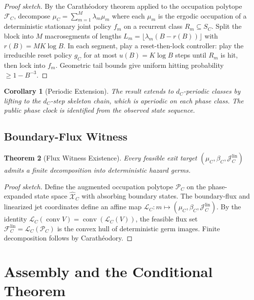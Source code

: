 \documentclass[12pt,a4paper]{article}
\newtheorem{theorem}{Theorem}[section]
\newtheorem{corollary}[theorem]{Corollary}
\theoremstyle{definition}
\newcommand{\cX}{\mathcal{X}}
\newcommand{\cF}{\mathcal{F}}
\newcommand{\cJ}{\mathcal{J}}
\newcommand{\cL}{\mathcal{L}}
\newcommand{\cP}{\mathcal{P}}
\DeclareMathOperator{\conv}{conv}
\begin{document}
\begin{proof}[Proof sketch]
By the Carath\'eodory theorem applied to the occupation polytope $\cF_C$, decompose $\mu_C = \sum_{m=1}^M \lambda_m \mu_m$ where each $\mu_m$ is the ergodic occupation of a deterministic stationary joint policy $f_m$ on a recurrent class $R_m \subseteq S_C$. Split the block into $M$ macrosegments of lengths $L_m = \lfloor \lambda_m(B - r(B)) \rfloor$ with $r(B) = MK \log B$. In each segment, play a reset-then-lock controller: play the irreducible reset policy $g_C$ for at most $u(B) = K \log B$ steps until $R_m$ is hit, then lock into $f_m$. Geometric tail bounds give uniform hitting probability $\geq 1 - B^{-3}$.
\end{proof}

\begin{corollary}[Periodic Extension]
\label{cor:periodic}
The result extends to $d_C$-periodic classes by lifting to the $d_C$-step skeleton chain, which is aperiodic on each phase class. The public phase clock is identified from the observed state sequence.
\end{corollary}

\subsection{Boundary-Flux Witness}
\label{sec:flux-witness}

\begin{theorem}[Flux Witness Existence]
\label{thm:flux-witness}
Every feasible exit target $(\mu_C, \beta_C, \cJ_C^{\mathrm{lin}})$ admits a finite decomposition into deterministic hazard germs.
\end{theorem}

\begin{proof}[Proof sketch]
Define the augmented occupation polytope $\cP_C$ on the phase-expanded state space $\hat{\cX}_C$ with absorbing boundary states. The boundary-flux and linearized jet coordinates define an affine map $\cL_C \colon m \mapsto (\mu_C, \beta_C, \cJ_C^{\mathrm{lin}})$. By the identity $\cL_C(\conv V) = \conv(\cL_C(V))$, the feasible flux set $\cF_C^{\mathrm{lin}} = \cL_C(\cP_C)$ is the convex hull of deterministic germ images. Finite decomposition follows by Carath\'eodory.
\end{proof}

\section{Assembly and the Conditional Theorem}
\label{sec:assembly}
\end{document}
